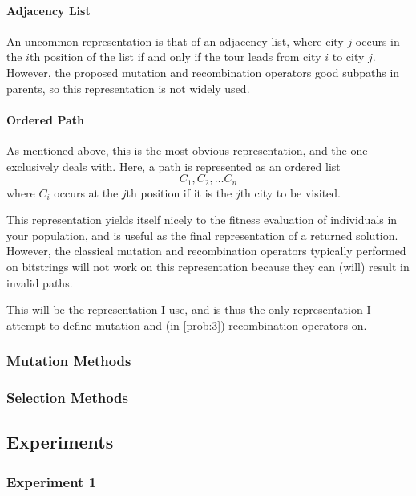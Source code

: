 \documentclass{article}
\begin{document}
\paragraph{Adjacency List}
An uncommon representation is that of an adjacency list, where city $j$ occurs in the $i$th
position of the list if and only if the tour leads from city $i$ to city $j$. However, the proposed
mutation and recombination operators good subpaths in parents, so this representation is not widely
used.

\paragraph{Ordered Path}
As mentioned above, this is the most obvious representation, and the one~\cite{tsp_ea} exclusively
deals with. Here, a path is represented as an ordered list
\[C_1, C_2, \dots C_n \]
where $C_i$ occurs at the $j$th position if it is the $j$th city to be visited.

This representation yields itself nicely to the fitness evaluation of individuals in your
population, and is useful as the final representation of a returned solution. However, the
classical mutation and recombination operators typically performed on bitstrings will not work on
this representation because they can (will) result in invalid paths.

This will be the representation I use, and is thus the only representation I attempt to define
mutation and (in \autoref{prob:3}) recombination operators on.

\subsubsection{Mutation Methods}
\subsubsection{Selection Methods}

\subsection{Experiments}
\subsubsection{Experiment 1}
\end{document}

